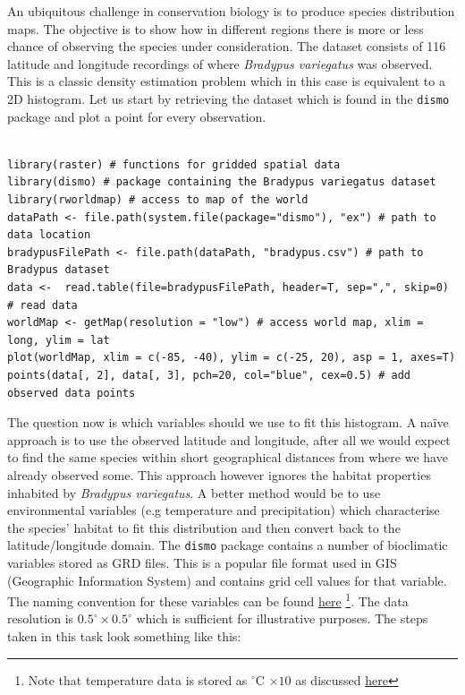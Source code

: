\documentclass[a4paper,11pt]{article}
\begin{document}
An ubiquitous challenge in conservation biology is to produce species distribution maps. The objective
is to show how in different regions there is more or less chance of observing the species under consideration.
The dataset consists of 116 latitude and longitude recordings of where \textit{Bradypus variegatus} was observed.
This is a classic density estimation problem which in this case is equivalent to a 2D histogram. Let us start by 
retrieving the dataset which is found in the \texttt{dismo} package and plot a point for every observation. 
\\\\
\begin{lstlisting}[style=RCode]
library(raster) # functions for gridded spatial data
library(dismo) # package containing the Bradypus variegatus dataset
library(rworldmap) # access to map of the world
dataPath <- file.path(system.file(package="dismo"), "ex") # path to data location
bradypusFilePath <- file.path(dataPath, "bradypus.csv") # path to Bradypus dataset
data <-  read.table(file=bradypusFilePath, header=T, sep=",", skip=0) # read data
worldMap <- getMap(resolution = "low") # access world map, xlim = long, ylim = lat
plot(worldMap, xlim = c(-85, -40), ylim = c(-25, 20), asp = 1, axes=T) 
points(data[, 2], data[, 3], pch=20, col="blue", cex=0.5) # add observed data points
\end{lstlisting}

The question now is which variables should we use to fit this histogram. A na\"{i}ve approach is to use the
observed latitude and longitude, after all we would expect to find the same species within short geographical 
distances from where we have already observed some. This approach however ignores the habitat properties
inhabited by \textit{Bradypus variegatus}. A better method would be to use environmental variables (e.g temperature and precipitation) 
which characterise the species' habitat to fit this distribution and then convert back to the 
latitude/longitude domain. The \texttt{dismo} package contains a number of bioclimatic variables stored as 
GRD files. This is a popular file format used in GIS (Geographic Information System) and contains grid cell
values for that variable. The naming convention for these variables can be found \href{http://www.worldclim.org/bioclim}{here}
\footnote{Note that temperature data is stored as $^\circ$C $\times 10$ as discussed \href{http://www.worldclim.org/formats}{here}}.	   
The data resolution is $0.5^\circ \times 0.5^\circ$ which is sufficient for illustrative purposes.
The steps taken in this task look something like this:
\end{document}

